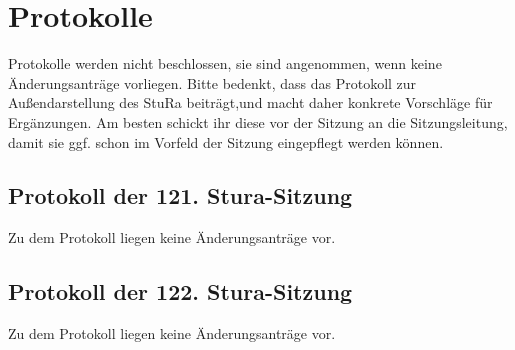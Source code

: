 \section{Protokolle}
Protokolle werden nicht beschlossen, sie sind angenommen, wenn keine Änderungsanträge vorliegen.
Bitte bedenkt, dass das Protokoll zur Außendarstellung des StuRa beiträgt,und macht daher konkrete Vorschläge
für Ergänzungen. Am besten schickt ihr diese vor der Sitzung an die Sitzungsleitung, damit sie ggf. schon im 
Vorfeld der Sitzung eingepflegt werden können.
\subsection{Protokoll der 121. Stura-Sitzung}
Zu dem Protokoll liegen keine Änderungsanträge vor.
\subsection{Protokoll der 122. Stura-Sitzung}
Zu dem Protokoll liegen keine Änderungsanträge vor.